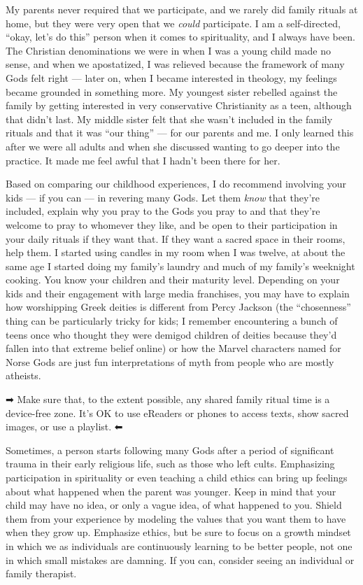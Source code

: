 \documentclass[
]{book}
\begin{document}
My parents never required that we participate, and we rarely did family rituals at home, but they were very open that we \emph{could} participate. I am a self-directed, ``okay, let's do this'' person when it comes to spirituality, and I always have been. The Christian denominations we were in when I was a young child made no sense, and when we apostatized, I was relieved because the framework of many Gods felt right --- later on, when I became interested in theology, my feelings became grounded in something more. My youngest sister rebelled against the family by getting interested in very conservative Christianity as a teen, although that didn't last. My middle sister felt that she wasn't included in the family rituals and that it was ``our thing'' --- for our parents and me. I only learned this after we were all adults and when she discussed wanting to go deeper into the practice. It made me feel awful that I hadn't been there for her.

Based on comparing our childhood experiences, I do recommend involving your kids --- if you can --- in revering many Gods. Let them \emph{know} that they're included, explain why you pray to the Gods you pray to and that they're welcome to pray to whomever they like, and be open to their participation in your daily rituals if they want that. If they want a sacred space in their rooms, help them. I started using candles in my room when I was twelve, at about the same age I started doing my family's laundry and much of my family's weeknight cooking. You know your children and their maturity level. Depending on your kids and their engagement with large media franchises, you may have to explain how worshipping Greek deities is different from Percy Jackson (the ``chosenness'' thing can be particularly tricky for kids; I remember encountering a bunch of teens once who thought they were demigod children of deities because they'd fallen into that extreme belief online) or how the Marvel characters named for Norse Gods are just fun interpretations of myth from people who are mostly atheists.

➡ Make sure that, to the extent possible, any shared family ritual time is a device-free zone. It's OK to use eReaders or phones to access texts, show sacred images, or use a playlist. ⬅

Sometimes, a person starts following many Gods after a period of significant trauma in their early religious life, such as those who left cults. Emphasizing participation in spirituality or even teaching a child ethics can bring up feelings about what happened when the parent was younger. Keep in mind that your child may have no idea, or only a vague idea, of what happened to you. Shield them from your experience by modeling the values that you want them to have when they grow up. Emphasize ethics, but be sure to focus on a growth mindset in which we as individuals are continuously learning to be better people, not one in which small mistakes are damning. If you can, consider seeing an individual or family therapist.
\end{document}
